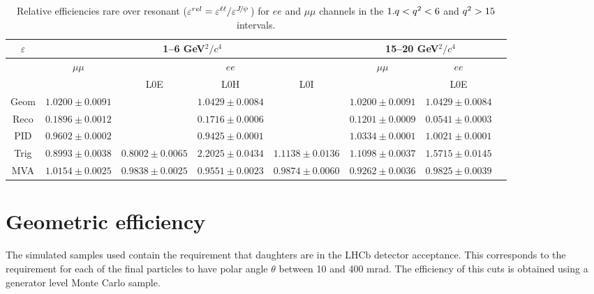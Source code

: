 \begin{landscape}
\begin{table}
\centering
\caption{Relative efficiencies rare over resonant ($\varepsilon^{rel} = \varepsilon^{\ell\ell} / \varepsilon^{\jpsi}$) 
for $ee$ and $\mu\mu$ channels in the $1.q < {q^2} < 6$ and ${q^2} > 15$ \gevgevcccc intervals.}
\begin{tabular}{|c|c|c|c|c|c|c|c|}
\hline $\varepsilon$ 			&  \multicolumn{4}{c|}{1--6 GeV$^2/c^4$}  				& \multicolumn {2}{c|}{15--20 GeV$^2/c^4$}  \\ \hline
 			&  $\mu\mu$  				& \multicolumn {3}{c|}{$ee$} 			&  $\mu\mu$  				& \multicolumn {1}{c|}{$ee$} \\ \hline
							&   &  L0E 	& L0H 	& L0I    &  	& L0E 	\\ \hline
Geom  & $ 1.0200 \pm 0.0091$ & \multicolumn{3}{c|}{$ 1.0429 \pm 0.0084$} & $ 1.0200 \pm 0.0091$ & \multicolumn{1}{c|}{$ 1.0429 \pm 0.0084$} \\
Reco  & $ 0.1896 \pm 0.0012$ & \multicolumn{3}{c|}{$ 0.1716 \pm 0.0006$} & $ 0.1201 \pm 0.0009$ & \multicolumn{1}{c|}{$ 0.0541 \pm 0.0003$} \\
PID  & $ 0.9602 \pm 0.0002$ & \multicolumn{3}{c|}{$ 0.9425 \pm 0.0001$} & $ 1.0334 \pm 0.0001$ & \multicolumn{1}{c|}{$ 1.0021 \pm 0.0001$} \\
							\hline
Trig  & $ 0.8993 \pm 0.0038 $ & $ 0.8002 \pm 0.0065 $ & $ 2.2025 \pm 0.0434 $ & $ 1.1138 \pm 0.0136 $ & $ 1.1098 \pm 0.0037 $ & $ 1.5715 \pm 0.0145 $ \\ 
MVA  & $ 1.0154 \pm 0.0025 $ & $ 0.9838 \pm 0.0025 $ & $ 0.9551 \pm 0.0023 $ & $ 0.9874 \pm 0.0060 $ & $ 0.9262 \pm 0.0036 $ & $ 0.9825 \pm 0.0039 $ \\  
							\hline

\end{tabular}
\label{tab:RKst_releff}
\end{table}

\end{landscape}


\section{Geometric efficiency}


The simulated samples used contain the requirement that daughters are in the LHCb
detector acceptance. This corresponds to the requirement for each of the final particles
to have polar angle $\theta$ between 10 and 400 mrad. The efficiency of this
cuts is obtained using a generator level Monte Carlo sample.

